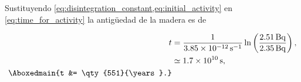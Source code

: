\documentclass[./../main.tex]{subfiles}
\begin{document}
\begin{exercise}
\begin{solution}
			\pagebreak
			Sustituyendo \cref{eq:disintegration_constant,eq:initial_activity} en \cref{eq:time_for_activity} la antigüedad de la madera es de

			\begin{align*}
				t &= \dfrac{1}{\qty[per-mode=power]{3.85e-12}{\per\s}}\ln\left(\dfrac{\qty{2.51}{\becquerel}}{\qty{2.35}{\becquerel}}\right),\\
				&\simeq \qty{1.7e10}{\s},\\
				\Aboxedmain{t &= \qty{551}{\years}.}
			\end{align*}
		\end{solution}
	\end{exercise}
\end{document}
